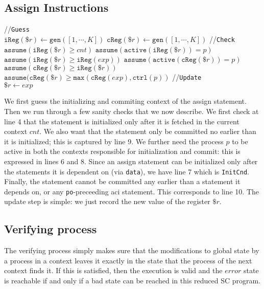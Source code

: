 \documentclass{article}
\newcommand{\var}{\texttt}
\begin{document}
\subsection{Assign Instructions}
\begin{algorithm}[H]
  \SetAlgoLined
  //\var{Guess}\\
  $\var{iReg}(\$r) \gets \var{gen}([1,\cdots,K])$\;
  $\var{cReg}(\$r) \gets \var{gen}([1,\cdots,K])$\;
  //\var{Check}\\
  $\var{assume}(\var{iReg}(\$r) \geq cnt)$\;
  $\var{assume}(\var{active}(\var{iReg}(\$r)) = p)$\;
  $\var{assume}(\var{iReg}(\$r) \geq \var{iReg}(exp))$\;
  $\var{assume}(\var{active}(\var{cReg}(\$r)) = p)$\;
  $\var{assume}(\var{cReg}(\$r) \geq \var{iReg}(\$r))$\;
  $\var{assume}(\var{cReg}(\$r) \geq \var{max}(\var{cReg}(exp),\var{ctrl}(p))$\;
  //\var{Update}\\
  $\$r \gets exp$\;
  \caption{$\llbracket \$r \leftarrow exp\rrbracket_K^{p,\var{Assign}}$}
\end{algorithm}
We first guess the initializing and commiting context of the assign statement. Then we run through a few sanity checks that we now describe. We first check at line 4 that the statement is initialized only after it is fetched in the current context $cnt$. We also want that the statement only be committed no earlier than it is initialized; this is captured by line 9. We further need the process $p$ to be active in both the contexts responsible for initialization and commit: this is expressed in lines 6 and 8. Since an assign statement can be initialized only after the statements it is dependent on (via \var{data}), we have line 7 which is \var{InitCnd}. Finally, the statement cannot be committed any earlier than a statement it depends on, or any \var{po}-preceeding aci statement. This corresponds to line 10. The update step is simple: we just record the new value of the register $\$r$.
\subsection{Verifying process}
\begin{algorithm}[H]
  \SetAlgoLined
  \For{$p \in \mathcal{P} \wedge x \in \mathcal{X} \wedge k \in [1,\cdots,K-1]$}{
    $\var{assume}(\mu(p,x,k) = \mu^{init}(p,x,k+1))$\;
  }
  \caption{$\langle \var{verProc} \rangle_K$.}
\end{algorithm}
The verifying process simply makes sure that the modifications to global state by a process in a context leaves it exactly in the state that the process of the next context finds it. If this is satisfied, then the execution is valid and the $error$ state is reachable if and only if a bad state can be reached in this reduced SC program.
\end{document}
